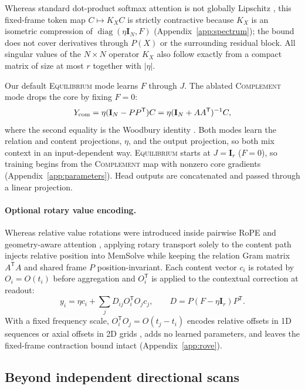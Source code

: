 \documentclass[10pt,twocolumn]{article}
\newcommand{\I}{\mathbf{I}}
\newcommand{\T}{\mathsf{T}}
\newcommand{\diag}{\operatorname{diag}}
\begin{document}
Whereas standard dot-product softmax attention is not globally Lipschitz
\cite{kim2021lipschitz}, this fixed-frame token map $C\mapsto K_XC$ is strictly
contractive because $K_X$ is an isometric compression of
$\diag(\eta\I_N,F)$ (Appendix~\ref{app:spectrum}); the bound does not cover
derivatives through $P(X)$ or the surrounding residual block.
All singular values of the $N\times N$ operator $K_X$ also follow exactly from
a compact matrix of size at most $r$ together with $|\eta|$.

Our default \textsc{Equilibrium} mode learns $F$ through $J$.
The ablated \textsc{Complement} mode drops the core by fixing $F=0$:
\begin{equation}
 Y_{\rm com}=\eta(\I_N-PP^\T)C=\eta(\I_N+AA^\T)^{-1}C,
 \label{eq:complement}
\end{equation}
where the second equality is the Woodbury identity \cite{golub2013matrix}.
Both modes learn the relation and content projections, $\eta$, and the output
projection, so both mix context in an input-dependent way.
\textsc{Equilibrium} starts at $J=\I_r$ ($F=0$), so training begins from the
\textsc{Complement} map with nonzero core gradients
(Appendix~\ref{app:parameters}).
Head outputs are concatenated and passed through a linear projection.

\paragraph{Optional rotary value encoding.}
Whereas relative value rotations were introduced inside pairwise RoPE and
geometry-aware attention \cite{su2024roformer,miyato2024gta,garcia2026rove},
applying rotary transport solely to the content path injects relative
position into MemSolve while keeping the relation Gram matrix $A^\T A$ and
shared frame $P$ position-invariant.
Each content vector $c_i$ is rotated by $O_i=O(t_i)$ before aggregation and
$O_i^\T$ is applied to the contextual correction at readout:
\begin{equation}
 y_i=\eta c_i+\sum_j D_{ij}O_i^\T O_j c_j,
 \qquad D=P(F-\eta\I_r)P^\T.
 \label{eq:rove-readout}
\end{equation}
With a fixed frequency scale, $O_i^\T O_j=O(t_j-t_i)$ encodes relative offsets
in 1D sequences or axial offsets in 2D grids \cite{heo2024ropevit}, adds no
learned parameters, and leaves the fixed-frame contraction bound intact
(Appendix~\ref{app:rove}).

\subsection{Beyond independent directional scans}
\label{sec:ssm}
\end{document}
